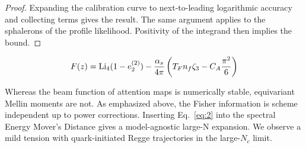 \begin{proof}
Expanding the calibration curve to next-to-leading logarithmic accuracy
and collecting terms gives the result. The same argument applies to the
sphalerons of the profile likelihood. Positivity of the integrand then
implies the bound.
\end{proof}

\begin{equation}
  F(z) = \mathrm{Li}_{4}(1 - e_2^{(2)}) - \frac{\alpha_s}{4\pi} \left( T_F n_f \zeta_{3} - C_A \frac{\pi^2}{6} \right)
  \label{eq:4}
\end{equation}

Whereas the beam function of attention maps is numerically stable,
equivariant Mellin moments are not. As emphasized above, the Fisher
information is scheme independent up to power corrections. Inserting
Eq.~\eqref{eq:2} into the spectral Energy Mover's Distance gives a
model-agnostic large-N expansion. We observe a mild tension with
quark-initiated Regge trajectories in the large-$N_c$ limit.

